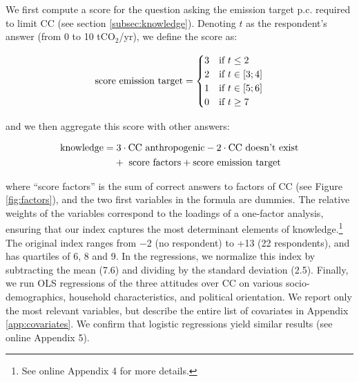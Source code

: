 \documentclass[english,5p,authoryear]{elsarticle}
\begin{document}
We first compute a score for the question asking the emission target p.c. required to limit CC (see section \ref{subsec:knowledge}). Denoting $t$ as the respondent's answer (from 0 to 10 tCO$_2$/yr), we define the score as:

\begin{equation}
\textnormal{score emission target}=\begin{cases}
3 & \text{if }t\leq2\\
2 & \text{if }t\in\left[3;4\right]\\
1 & \text{if }t\in\left[5;6\right]\\
0 & \text{if }t\geq7
\end{cases}
\end{equation}

\noindent and we then aggregate this score with other answers:

\begin{align}
\textnormal{knowledge} = & \; 3\cdot \textnormal{CC anthropogenic}-2\cdot \textnormal{CC doesn't exist} \nonumber \\ & + \textnormal{ score factors}+\textnormal{score emission target} \label{eq:knowledge2}
\end{align}

where ``score factors'' is the sum of correct answers to factors of CC (see Figure \ref{fig:factors}), and the two first variables in the formula are dummies. The relative weights of the variables correspond to the loadings of a one-factor analysis, ensuring that our index captures the most determinant elements of knowledge.\footnote{See online Appendix 4 for more details.} The original index ranges from $-$2 (no respondent) to +13 (22 respondents), and has quartiles of 6, 8 and 9. In the regressions, we normalize this index by subtracting the mean (7.6) and dividing by the standard deviation (2.5). Finally, we run OLS regressions of the three attitudes over CC on various socio-demographics, household characteristics, and political orientation. We report only the most relevant variables, but describe the entire list of covariates in Appendix \ref{app:covariates}. We confirm that logistic regressions yield similar results (see online Appendix 5).
\end{document}
